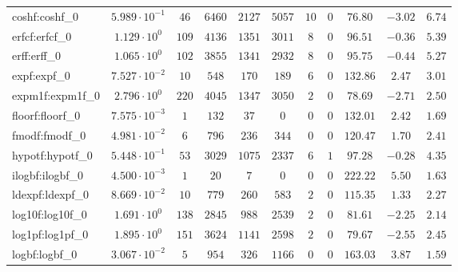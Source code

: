 \begin{tabular}{|l|c|c|c|c|c|c|c|c|c|c|}
coshf:coshf\_0               & $ 5.989 \cdot 10^{-1} $ & $ 46     $ & $ 6460   $ & $ 2127  $ & $ 5057  $ & $ 10  $ & $ 0 $ & $ 76.80       $ & $ -3.02   $ & $ 6.74    $ \\
erfcf:erfcf\_0               & $ 1.129 \cdot 10^{0}  $ & $ 109    $ & $ 4136   $ & $ 1351  $ & $ 3011  $ & $ 8   $ & $ 0 $ & $ 96.51       $ & $ -0.36   $ & $ 5.39    $ \\
erff:erff\_0                 & $ 1.065 \cdot 10^{0}  $ & $ 102    $ & $ 3855   $ & $ 1341  $ & $ 2932  $ & $ 8   $ & $ 0 $ & $ 95.75       $ & $ -0.44   $ & $ 5.27    $ \\
expf:expf\_0                 & $ 7.527 \cdot 10^{-2} $ & $ 10     $ & $ 548    $ & $ 170   $ & $ 189   $ & $ 6   $ & $ 0 $ & $ 132.86      $ & $ 2.47    $ & $ 3.01    $ \\
expm1f:expm1f\_0             & $ 2.796 \cdot 10^{0}  $ & $ 220    $ & $ 4045   $ & $ 1347  $ & $ 3050  $ & $ 2   $ & $ 0 $ & $ 78.69       $ & $ -2.71   $ & $ 2.50    $ \\
floorf:floorf\_0             & $ 7.575 \cdot 10^{-3} $ & $ 1      $ & $ 132    $ & $ 37    $ & $ 0     $ & $ 0   $ & $ 0 $ & $ 132.01      $ & $ 2.42    $ & $ 1.69    $ \\
fmodf:fmodf\_0               & $ 4.981 \cdot 10^{-2} $ & $ 6      $ & $ 796    $ & $ 236   $ & $ 344   $ & $ 0   $ & $ 0 $ & $ 120.47      $ & $ 1.70    $ & $ 2.41    $ \\
hypotf:hypotf\_0             & $ 5.448 \cdot 10^{-1} $ & $ 53     $ & $ 3029   $ & $ 1075  $ & $ 2337  $ & $ 6   $ & $ 1 $ & $ 97.28       $ & $ -0.28   $ & $ 4.35    $ \\
ilogbf:ilogbf\_0             & $ 4.500 \cdot 10^{-3} $ & $ 1      $ & $ 20     $ & $ 7     $ & $ 0     $ & $ 0   $ & $ 0 $ & $ 222.22      $ & $ 5.50    $ & $ 1.63    $ \\
ldexpf:ldexpf\_0             & $ 8.669 \cdot 10^{-2} $ & $ 10     $ & $ 779    $ & $ 260   $ & $ 583   $ & $ 2   $ & $ 0 $ & $ 115.35      $ & $ 1.33    $ & $ 2.27    $ \\
log10f:log10f\_0             & $ 1.691 \cdot 10^{0}  $ & $ 138    $ & $ 2845   $ & $ 988   $ & $ 2539  $ & $ 2   $ & $ 0 $ & $ 81.61       $ & $ -2.25   $ & $ 2.14    $ \\
log1pf:log1pf\_0             & $ 1.895 \cdot 10^{0}  $ & $ 151    $ & $ 3624   $ & $ 1141  $ & $ 2598  $ & $ 2   $ & $ 0 $ & $ 79.67       $ & $ -2.55   $ & $ 2.45    $ \\
logbf:logbf\_0               & $ 3.067 \cdot 10^{-2} $ & $ 5      $ & $ 954    $ & $ 326   $ & $ 1166  $ & $ 0   $ & $ 0 $ & $ 163.03      $ & $ 3.87    $ & $ 1.59    $ \\

\end{tabular}
